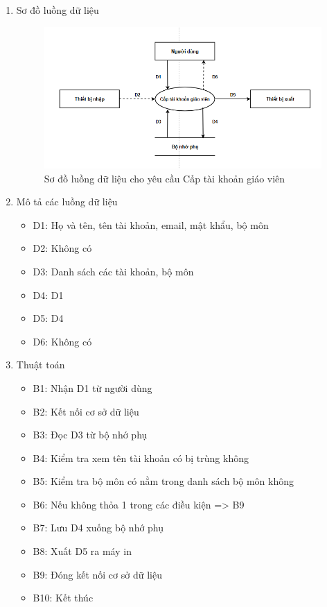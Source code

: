 \documentclass[a4paper]{article}
\begin{document}
\begin{enumerate}
\item Sơ đồ luồng dữ liệu
\begin{figure}[H] 
    \centering
    \includegraphics[width=1\textwidth]{dfd12} %
    \caption{Sơ đồ luồng dữ liệu cho yêu cầu Cấp tài khoản giáo viên}
\end{figure}
\item Mô tả các luồng dữ liệu
\begin{itemize}
\item D1: Họ và tên, tên tài khoản, email, mật khẩu, bộ môn
\item D2: Không có
\item D3: Danh sách các tài khoản, bộ môn
\item D4: D1
\item D5: D4
\item D6: Không có
\end{itemize}
\item Thuật toán
\begin{itemize}
\item B1: Nhận D1 từ người dùng
\item B2: Kết nối cơ sở dữ liệu
\item B3: Đọc D3 từ bộ nhớ phụ
\item B4: Kiểm tra xem tên tài khoản có bị trùng không
\item B5: Kiểm tra bộ môn có nằm trong danh sách bộ môn không
\item B6: Nếu không thỏa 1 trong các điều kiện => B9
\item B7: Lưu D4 xuống bộ nhớ phụ
\item B8: Xuất D5 ra máy in
\item B9: Đóng kết nối cơ sở dữ liệu
\item B10: Kết thúc
\end{itemize}
\end{enumerate}	
\end{document}
